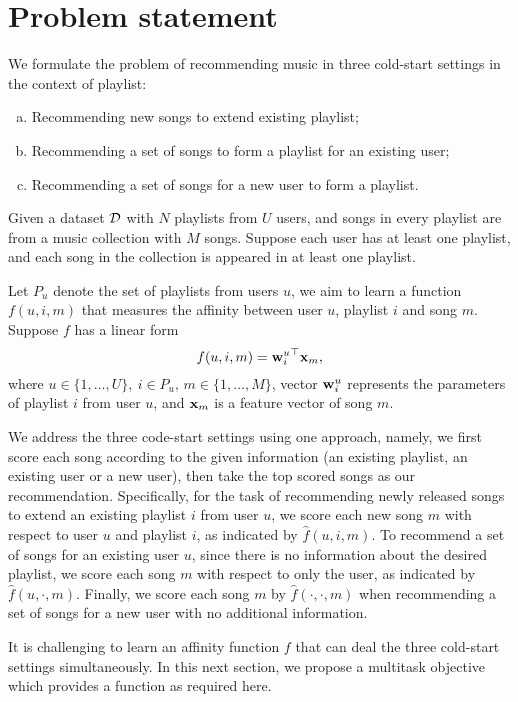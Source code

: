 \section{Problem statement}
\label{sec:problem}

We formulate the problem of recommending music in three cold-start settings in the context of playlist:
\begin{enumerate}[(a)]
\item Recommending new songs to extend existing playlist;
\item Recommending a set of songs to form a playlist for an existing user;
\item Recommending a set of songs for a new user to form a playlist.
\end{enumerate}

Given a dataset $\mathcal{D}$ with $N$ playlists from $U$ users, 
and songs in every playlist are from a music collection with $M$ songs.
Suppose each user has at least one playlist, and each song in the collection 
is appeared in at least one playlist.

Let $P_u$ denote the set of playlists from users $u$,
we aim to learn a function $f(u, i, m)$ that measures the affinity between user $u$, 
playlist $i$ and song $m$. Suppose $f$ has a linear form
\begin{equation}
\label{eq:scorefunc}
f(u, i, m) = {\mathbf{w}_i^u}^\top \mathbf{x}_m,
\end{equation}
where $u \in \{1,\dots,U\}, \ i \in P_u, \, m \in \{1,\dots,M\}$,
vector $\mathbf{w}_i^u$ represents the parameters of playlist $i$ from user $u$,
and $\mathbf{x}_m$ is a feature vector of song $m$.

We address the three code-start settings using one approach, namely, we first score each song 
according to the given information (\eg an existing playlist, an existing user or a new user),
then take the top scored songs as our recommendation.
Specifically, for the task of recommending newly released songs to extend an existing playlist $i$ from user $u$,
we score each new song $m$ with respect to user $u$ and playlist $i$, as indicated by $\hat f(u, i, m)$.
To recommend a set of songs for an existing user $u$,
since there is no information about the desired playlist, we score each song $m$ with respect to only the user,
as indicated by $\hat f(u, \cdot, m)$.
Finally, we score each song $m$ by $\hat f(\cdot, \cdot, m)$ when recommending a set of songs 
for a new user with no additional information.

It is challenging to learn an affinity function $f$ that can deal the three cold-start settings simultaneously.
In this next section, we propose a multitask objective which provides a function as required here.
